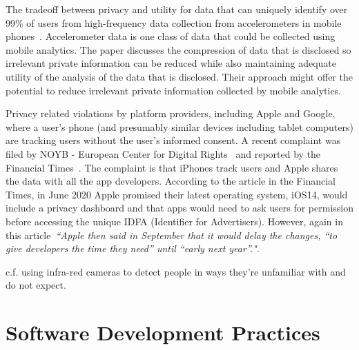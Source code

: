 
The tradeoff between privacy and utility for data that can uniquely identify over 99\% of users from high-frequency data collection from accelerometers in mobile phones~\citep{menasria2018_purpose_driven_privacy_preservation_accelerometers}. Accelerometer data is one class of data that could be collected using mobile analytics. The paper discusses the compression of data that is disclosed so irrelevant private information can be reduced while also maintaining adequate utility of the analysis of the data that is disclosed. Their approach might offer the potential to reduce irrelevant private information collected by mobile analytics.

Privacy related violations by platform providers, including Apple and Google, where a user's phone (and presumably similar devices including tablet computers) are tracking users without the user's informed consent. A recent complaint was filed by NOYB - European Center for Digital Rights~\citep{noyb2020_noyb_files_complaint_against_apples_tracking_code_idfa} and reported by the Financial Times~\citep{ft2020_apple_tracks_iphone_users_without_consent}. The complaint is that iPhones track users and Apple shares the data with all the app developers. According to the article in the Financial Times, in June 2020 Apple promised their latest operating system, iOS14, would include a privacy dashboard and that apps would need to ask users for permission before accessing the unique IDFA (Identifier for Advertisers). However, again in this article~\emph{``Apple then said in September that it would delay the changes, “to give developers the time they need” until “early next year”."}. 



c.f. using infra-red cameras to detect people in ways they're unfamiliar with and do not expect. 

\section{Software Development Practices}

